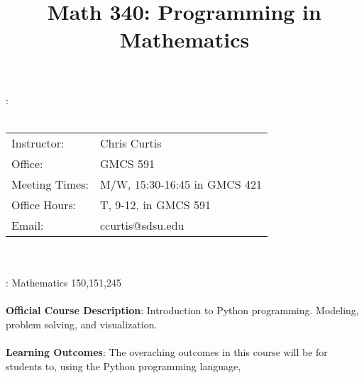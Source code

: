 \documentclass[a4paper,11pt]{article}
\title{Math 340: Programming in Mathematics}
\date{}
\begin{document}
\maketitle

:\\
\\
\begin{tabular}[]{ll}
Instructor:& Chris Curtis\\
Office:& GMCS 591\\
Meeting Times: & M/W, 15:30-16:45 in GMCS 421\\
Office Hours:& T, 9-12, in GMCS 591\\
Email: & ccurtis@sdsu.edu\\
\end{tabular}
\\ \\
: Mathematics 150,151,245  \\
\\
{\bf Official Course Description}: Introduction to Python programming. Modeling, problem solving, and visualization.\\
\\
{\bf Learning Outcomes}:
The overaching outcomes in this course will be for students to, using the Python programming language, 
\end{document}
